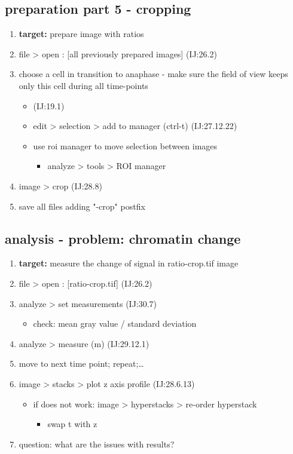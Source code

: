 \documentclass[11pt]{article}
\begin{document}
\subsection{preparation part 5 - cropping}
\label{sec-9-6}
\begin{enumerate}
\item \textbf{target:} prepare image with ratios
\item file > open : [all previously prepared images] (IJ:26.2)
\item choose a cell in transition to anaphase - make sure the field of
view keeps only this cell during all time-points
\begin{itemize}
\item{} (IJ:19.1)
\item edit > selection > add to manager (ctrl-t) (IJ:27.12.22)
\item use roi manager to move selection between images
\begin{itemize}
\item analyze > tools > ROI manager
\end{itemize}
\end{itemize}
\item image > crop (IJ:28.8)
\item save all files adding "-crop" postfix
\end{enumerate}

\subsection{analysis - problem: chromatin change}
\label{sec-9-7}
\begin{enumerate}
\item \textbf{target:} measure the change of signal in ratio-crop.tif image
\item file > open : [ratio-crop.tif] (IJ:26.2)
\item analyze > set measurements (IJ:30.7)
\begin{itemize}
\item check: mean gray value / standard deviation
\end{itemize}
\item analyze > measure (m) (IJ:29.12.1)
\item move to next time point; repeat;\ldots{}
\item image > stacks > plot z axis profile (IJ:28.6.13)
\begin{itemize}
\item if does not work: image > hyperstacks > re-order hyperstack
\begin{itemize}
\item swap t with z
\end{itemize}
\end{itemize}
\item question: what are the issues with results?
\end{enumerate}
\end{document}
